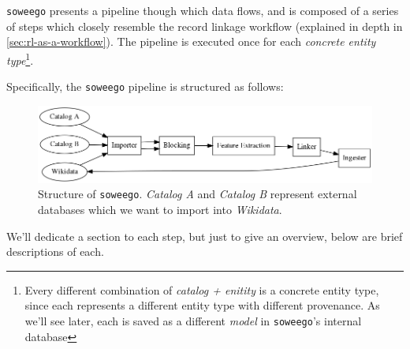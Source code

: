 \documentclass[epsfig,a4paper,11pt,titlepage,twoside,openany]{book}
\begin{document}

\texttt{soweego} presents a pipeline though which data flows, and is composed of a series of steps which closely resemble the record linkage workflow (explained in depth in \autoref{sec:rl-as-a-workflow}). The pipeline is executed once for each  \textit{concrete entity type}\footnote{Every different combination of \textit{catalog + enitity}  is a concrete entity type, since each represents a different entity type with different provenance. As we'll see later, each is saved as a different \textit{model} in \texttt{soweego}'s internal database}.

Specifically, the \texttt{soweego} pipeline is structured as follows:

\begin{figure}[H]
  \centering \includegraphics[width=\textwidth]{soweego_structure}
  \caption{Structure of \texttt{soweego}. \textit{Catalog A} and \textit{Catalog
      B} represent external databases which we want to import into
    \textit{Wikidata}.}
  \label{fig:soweego-structure}
\end{figure}

We'll dedicate a section to each step, but just to give an overview, below are brief  descriptions of each.
\end{document}
